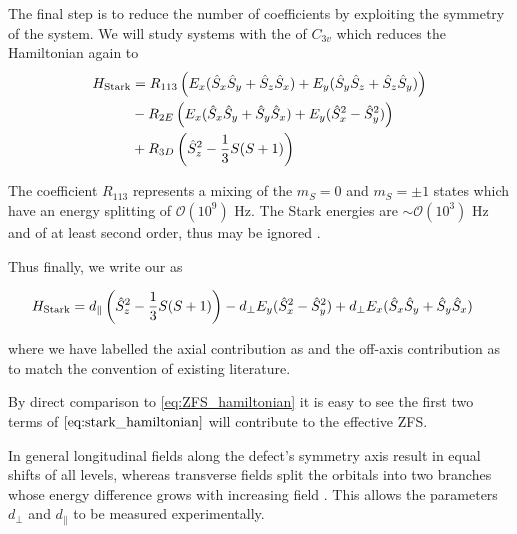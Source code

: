 The final step is to reduce the number of coefficients by exploiting the symmetry of the system. We will study systems with the  of $C_{3v}$ \cite{Davidsson2018} which reduces the Hamiltonian again to \cite{mims}
\begin{equation}
    \begin{align}
        H_{\ce{Stark}} &= R_{113}\left(E_x (\hat{S}_x\hat{S}_y + \hat{S}_z\hat{S}_x) + E_y(\hat{S}_y\hat{S}_z + \hat{S}_z\hat{S}_y) \right) \\ 
                       &- R_{2E} \left(E_x(\hat{S}_x\hat{S}_y + \hat{S}_y\hat{S}_x) + E_y(\hat{S}_x^2 - \hat{S}_y^2   )\right) \\ 
                       &+ R_{3D}\left(\hat{S}_z^2 - \frac{1}{3} S(S+1)\right)
    \end{align}
    \label{eq:}
\end{equation}


The coefficient $R_{113}$ represents a mixing of the $m_S = 0$ and $m_S = \pm 1$ states which have an energy splitting of $\mathcal{O}(10^9)$ Hz. The Stark energies are $\sim \mathcal{O} (10^3)$ Hz and of at least second order, thus may be ignored \cite{VanOort1990}.  

Thus finally, we write our  as 

\begin{equation}
    \begin{align}
        H_{\ce{Stark}} &=
                        d_\parallel\left(\hat{S}_z^2 - \frac{1}{3} S(S+1)\right)
        - d_\perp  E_y(\hat{S}_x^2 - \hat{S}_y^2   ) + d_\perp E_x(\hat{S}_x\hat{S}_y + \hat{S}_y\hat{S}_x)  
    \end{align}
    \label{eq:stark_hamiltonian}
\end{equation}

where we have labelled the axial contribution as  and the off-axis contribution as  to match the convention of existing literature. 

By direct comparison to \eqref{eq:ZFS_hamiltonian} it is easy to see the first two terms of $\eqref{eq:stark_hamiltonian}$ will contribute to the effective ZFS.  

In general longitudinal fields along the defect’s symmetry axis result in equal shifts of all levels, whereas transverse fields split the orbitals into two branches whose energy difference grows with increasing field \cite{Acosta2012, Bassett2011}. This allows the parameters $d_\perp$ and $d_\parallel$ to be measured experimentally. 

